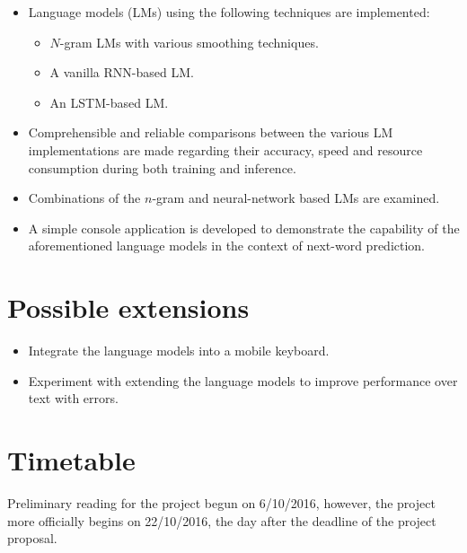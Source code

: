 \documentclass[a4paper, 12pt]{article}
\begin{document}
\begin{itemize}
\item
	Language models (LMs) using the following techniques are implemented:
	\begin{itemize}
	\item
		$N$-gram LMs with various smoothing techniques.
	\item
		A vanilla RNN-based LM.
	\item
		An LSTM-based LM.
	\end{itemize}
\item
	Comprehensible and reliable comparisons between the various LM implementations are made regarding their accuracy, speed and resource consumption during both training and inference.
\item
	Combinations of the $n$-gram and neural-network based LMs are examined.
\item
	A simple console application is developed to demonstrate the capability of the aforementioned language models in the context of next-word prediction.
\end{itemize}

\section*{Possible extensions}

\begin{itemize}
\item
	Integrate the language models into a mobile keyboard.
\item
	Experiment with extending the language models to improve performance over text with errors.
\end{itemize}

\section*{Timetable}

Preliminary reading for the project begun on 6/10/2016, however, the project more officially begins on 22/10/2016, the day after the deadline of the project proposal.
\end{document}
